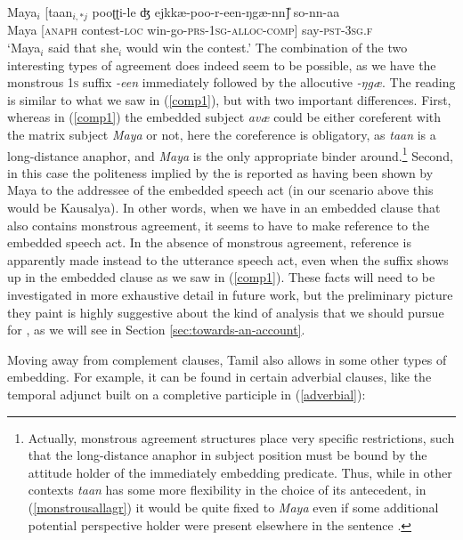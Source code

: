 \documentclass[output=paper, modfonts, nonflat]{langsci/langscibook}
\begin{document}
\ea\label{monstrousallagr}\gll Maya$_i$ [taan$_{i,*j}$ pooʈʈi-le ʤ
ejkkæ-poo-r-een-ŋgæ-nn\U] so-nn-aa\\  
Maya [\textsc{anaph} contest-\textsc{loc}{}
win-go-\textsc{prs}-1\textsc{sg}-\textsc{alloc}-\textsc{comp}] say-\textsc{pst}-3\textsc{sg.f}\\ 
\glt `Maya$_i$ said that she$_i$ would win the contest.'
\z
%
The combination of the two interesting types of agreement does indeed
seem to be possible, as we have the monstrous \textsc{1s} suffix
\textit{-een} immediately followed by the allocutive
\textit{-ŋgæ}. The reading is similar to what we saw in
(\ref{comp1}), but with two important differences. First, whereas in
(\ref{comp1}) the embedded subject \textit{avæ} could be either
coreferent with the matrix subject \textit{Maya} or not, here the
coreference is obligatory, as \textit{taan} is a long-distance
anaphor, and \textit{Maya} is the only appropriate binder
around.\footnote{Actually, monstrous agreement structures place very
  specific restrictions, such that the long-distance anaphor in
  subject position must be bound by the attitude holder of the
  immediately embedding predicate. Thus, while in other contexts
  \textit{taan} has some more flexibility in the choice of its
  antecedent, in (\ref{monstrousallagr}) it would be quite fixed to
  \textit{Maya} even if some additional potential perspective holder
  were present elsewhere in the sentence \citep[see][for
  details]{sundaresan:diss}.} Second, in this case the politeness
implied by the \allagr{} is reported as having been shown by Maya to
the addressee of the embedded speech act (in our scenario above this
would be Kausalya). In other words, when we have \allagr{} in an
embedded clause that also contains monstrous agreement, it seems to
have to make reference to the embedded speech act. In the absence of
monstrous agreement, reference is apparently made instead to the
utterance speech act, even when the suffix shows up in the embedded
clause as we saw in (\ref{comp1}). These facts will need to be
investigated in more exhaustive detail in future work, but the
preliminary picture they paint is highly suggestive about the kind of
analysis that we should pursue for \allagr, as we will see in Section
\ref{sec:towards-an-account}.

Moving away from complement clauses, Tamil also allows \allagr{} in
some other types of embedding. For example, it can be found in certain
adverbial clauses, like the temporal adjunct built on a completive
participle in (\ref{adverbial}):
\end{document}
